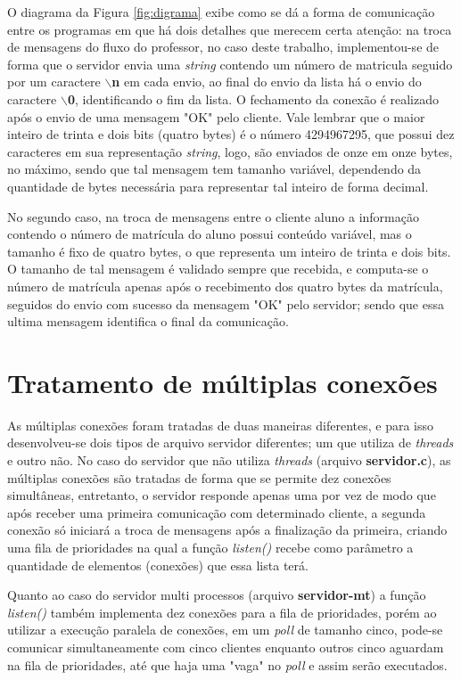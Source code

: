\documentclass[10pt]{extarticle}
\begin{document}
O diagrama da Figura \ref{fig:digrama} exibe como se dá a forma de comunicação entre os programas em que há dois detalhes que merecem certa atenção: na troca de mensagens do fluxo do professor, no caso deste trabalho, implementou-se de forma que o servidor envia uma \textit{string} contendo um número de matricula seguido por um caractere \textbf{$\backslash$n} em cada envio, ao final do envio da lista há o envio do caractere \textbf{$\backslash$0}, identificando o fim da lista. O fechamento da conexão é realizado após o envio de uma mensagem "OK" pelo cliente. Vale lembrar que o maior inteiro de trinta e dois bits (quatro bytes) é o número 4294967295, que possui dez caracteres em sua representação \textit{string}, logo, são enviados de onze em onze bytes, no máximo, sendo que tal mensagem tem tamanho variável, dependendo da quantidade de bytes necessária para representar tal inteiro de forma decimal.

No segundo caso, na troca de mensagens entre o cliente aluno a informação contendo o número de matrícula do aluno possui conteúdo variável, mas o tamanho é fixo de quatro bytes, o que representa um inteiro de trinta e dois bits. O tamanho de tal mensagem é validado sempre que recebida, e computa-se o número de matrícula apenas após o recebimento dos quatro bytes da matrícula, seguidos do envio com sucesso da mensagem "OK" pelo servidor; sendo que essa ultima mensagem identifica o final da comunicação.

\section{Tratamento de múltiplas conexões}

As múltiplas conexões foram tratadas de duas maneiras diferentes, e para isso desenvolveu-se dois tipos de arquivo servidor diferentes; um que utiliza de \textit{threads} e outro não. No caso do servidor que não utiliza \textit{threads} (arquivo \textbf{servidor.c}), as múltiplas conexões são tratadas de forma que se permite dez conexões simultâneas, entretanto, o servidor responde apenas uma por vez de modo que após receber uma primeira comunicação com determinado cliente, a segunda conexão só iniciará a troca de mensagens após a finalização da primeira, criando uma fila de prioridades na qual a função \textit{listen()} recebe como parâmetro a quantidade de elementos (conexões) que essa lista terá.

Quanto ao caso do servidor multi processos (arquivo \textbf{servidor-mt}) a função \textit{listen()} também implementa dez conexões para a fila de prioridades, porém ao utilizar a execução paralela de conexões, em um \textit{poll} de tamanho cinco, pode-se comunicar simultaneamente com cinco clientes enquanto outros cinco aguardam na fila de prioridades, até que haja uma "vaga" no \textit{poll} e assim serão executados.
\end{document}
